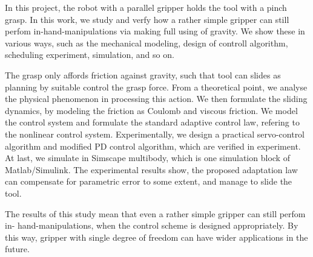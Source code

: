 \begin{enabstract}
In this project, the robot with a parallel gripper holds the tool with a pinch grasp.
In this work, we study and verfy how a rather simple gripper can still perfom in-hand-manipulations via making full using of gravity. We show these in various ways, such as the mechanical modeling, design of controll algorithm, scheduling experiment, simulation, and so on.

The grasp only affords friction against gravity,
such that tool can slides as planning by suitable control the grasp force.
From a theoretical point, we analyse the physical phenomenon in processing this action.
We then formulate the sliding dynamics,
by modeling the friction as Coulomb and viscous friction.
We model the control system and formulate the standard adaptive control law,
refering to the nonlinear control system.
Experimentally, we design a practical servo-control algorithm and
modified PD control algorithm, which are verified in experiment.
At last, we simulate in Simscape multibody,
which is one simulation block of Matlab/Simulink.
The experimental results show, the proposed adaptation law can
compensate for parametric error to some extent, and manage to slide the tool.

The results of this study mean that even a rather simple gripper can still perfom in- hand-manipulations, when the control scheme is designed appropriately. By this way, gripper with single degree of freedom can have wider applications in the future.


\end{enabstract}
